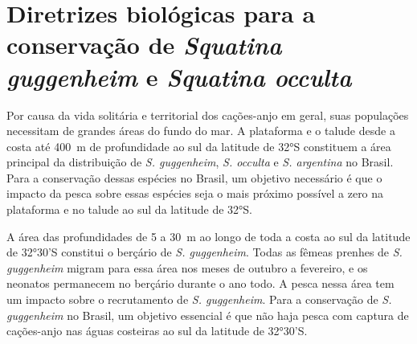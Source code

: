 \documentclass[a4paper,11pt,twoside,showtrims,onecolumn,openright,final]{memoir}
\begin{document}
\section*{Diretrizes biológicas para a conservação de \emph{Squatina guggenheim} e \emph{Squatina occulta}}

Por causa da vida solitária e territorial dos cações-anjo em geral, suas populações necessitam 
de grandes áreas do fundo do mar. A plataforma e o talude desde a costa até 400~m de profundidade 
ao sul da latitude de 32°S constituem a área principal da distribuição de \emph{S. guggenheim}, 
\emph{S. occulta} e \emph{S. argentina} no Brasil. Para a conservação dessas espécies no Brasil, 
um objetivo necessário é que o impacto da pesca sobre essas espécies seja o mais próximo possível 
a zero na plataforma e no talude ao sul da latitude de 32°S. 

A área das profundidades de 5 a 30~m ao longo de toda a costa ao sul da latitude de 32°30'S constitui 
o berçário de \emph{S. guggenheim}. Todas as fêmeas prenhes de \emph{S. guggenheim} migram para essa 
área nos meses de outubro a fevereiro, e os neonatos permanecem no berçário durante o ano todo. 
A pesca nessa área tem um impacto sobre o recrutamento de \emph{S. guggenheim}. 
Para a conservação de \emph{S. guggenheim} no Brasil,  um objetivo essencial é que não haja 
pesca com captura de cações-anjo nas águas costeiras  ao sul da latitude de 32°30'S.


\end{document}
